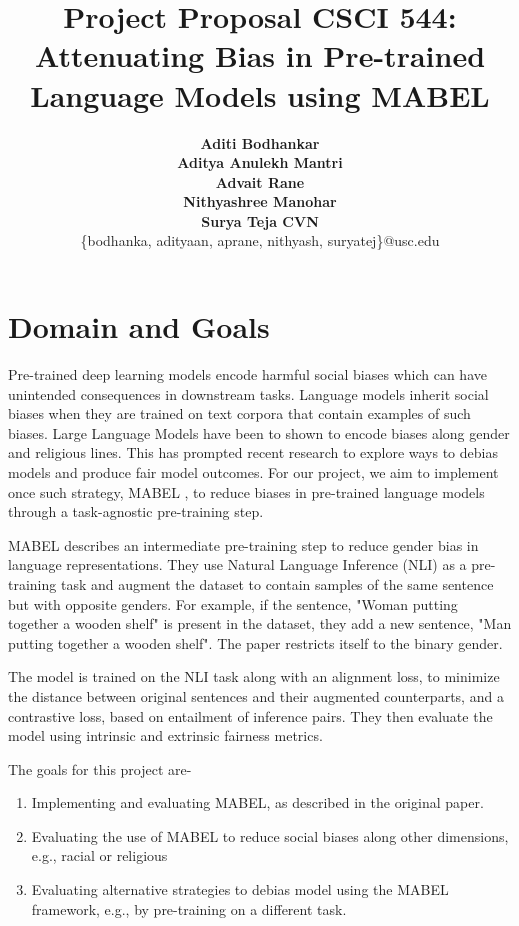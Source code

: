 \documentclass[11pt]{article}
\title{Project Proposal CSCI 544: Attenuating Bias in Pre-trained Language Models using MABEL}
\author{{\bf Aditi Bodhankar} \\ {\bf Aditya Anulekh Mantri} \\ {\bf Advait Rane} \\ {\bf Nithyashree Manohar} \\ {\bf Surya Teja CVN} \\ \{bodhanka, adityaan, aprane, nithyash, suryatej\}@usc.edu}
\begin{document}
\maketitle

\section{Domain and Goals}
Pre-trained deep learning models encode harmful social biases which can have unintended consequences in downstream tasks. Language models inherit social biases when they are trained on text corpora that contain examples of such biases. Large Language Models have been to shown to encode biases along gender and religious lines. This has prompted recent research to explore ways to debias models and produce fair model outcomes. For our project, we aim to implement once such strategy, MABEL \cite{he2022mabel}, to reduce biases in pre-trained language models through a task-agnostic pre-training step.

MABEL describes an intermediate pre-training step to reduce gender bias in language representations. They use Natural Language Inference (NLI) as a pre-training task and augment the dataset to contain samples of the same sentence but with opposite genders. For example, if the sentence, "Woman putting together a wooden shelf" is present in the dataset, they add a new sentence, "Man putting together a wooden shelf". The paper restricts itself to the binary gender. 

The model is trained on the NLI task along with an alignment loss, to minimize the distance between original sentences and their augmented counterparts, and a contrastive loss, based on entailment of inference pairs. They then evaluate the model using intrinsic and extrinsic fairness metrics. 

The goals for this project are-
\begin{enumerate}
    \item Implementing and evaluating MABEL, as described in the original paper.
    \item Evaluating the use of MABEL to reduce social biases along other dimensions, e.g., racial or religious
    \item Evaluating alternative strategies to debias model using the MABEL framework, e.g., by pre-training on a different task.
\end{enumerate}
\end{document}
